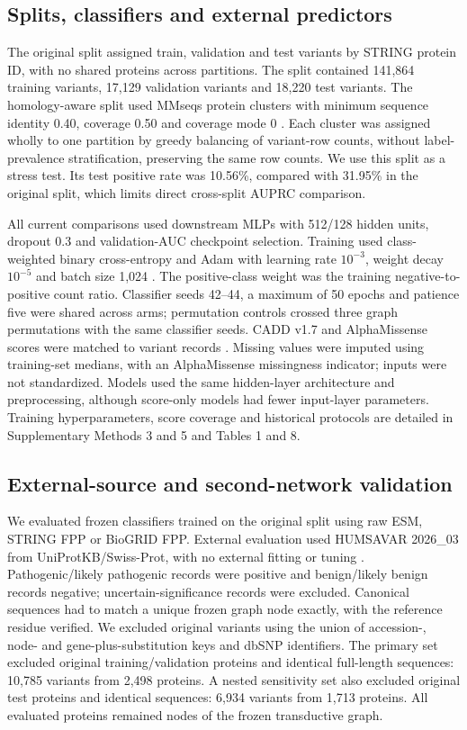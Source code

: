 \documentclass[conference]{IEEEtran}
\begin{document}
\subsection{Splits, classifiers and external predictors}

The original split assigned train, validation and test variants by STRING protein ID, with no shared proteins across partitions. The split contained 141,864 training variants, 17,129 validation variants and 18,220 test variants. The homology-aware split used MMseqs protein clusters with minimum sequence identity 0.40, coverage 0.50 and coverage mode 0 \cite{Steinegger2017MMseqs2}. Each cluster was assigned wholly to one partition by greedy balancing of variant-row counts, without label-prevalence stratification, preserving the same row counts. We use this split as a stress test. Its test positive rate was 10.56\%, compared with 31.95\% in the original split, which limits direct cross-split AUPRC comparison.

All current comparisons used downstream MLPs with 512/128 hidden units, dropout 0.3 and validation-AUC checkpoint selection. Training used class-weighted binary cross-entropy and Adam with learning rate $10^{-3}$, weight decay $10^{-5}$ and batch size 1,024 \cite{Kingma2015Adam}. The positive-class weight was the training negative-to-positive count ratio. Classifier seeds 42--44, a maximum of 50 epochs and patience five were shared across arms; permutation controls crossed three graph permutations with the same classifier seeds. CADD v1.7 and AlphaMissense scores were matched to variant records \cite{Schubach2024CADDv17,Cheng2023AlphaMissense}. Missing values were imputed using training-set medians, with an AlphaMissense missingness indicator; inputs were not standardized. Models used the same hidden-layer architecture and preprocessing, although score-only models had fewer input-layer parameters. Training hyperparameters, score coverage and historical protocols are detailed in Supplementary Methods 3 and 5 and Tables 1 and 8.

\subsection{External-source and second-network validation}

We evaluated frozen classifiers trained on the original split using raw ESM, STRING FPP or BioGRID FPP. External evaluation used HUMSAVAR 2026\_03 from UniProtKB/\allowbreak{}Swiss-Prot, with no external fitting or tuning \cite{UniProt2025}. Pathogenic/likely pathogenic records were positive and benign/likely benign records negative; uncertain-significance records were excluded. Canonical sequences had to match a unique frozen graph node exactly, with the reference residue verified. We excluded original variants using the union of accession-, node- and gene-plus-substitution keys and dbSNP identifiers. The primary set excluded original training/validation proteins and identical full-length sequences: 10,785 variants from 2,498 proteins. A nested sensitivity set also excluded original test proteins and identical sequences: 6,934 variants from 1,713 proteins. All evaluated proteins remained nodes of the frozen transductive graph.
\end{document}
